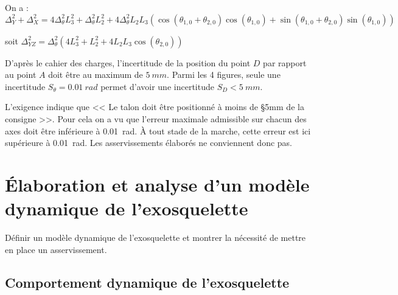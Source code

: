 \ifprof\begin{corrige}
 On a : 
$\Delta_{Y}^2 + \Delta_{X}^2 = 4\Delta_{\theta}^2L_3^2 + \Delta_{\theta}^2L_2^2 
+ 4\Delta_{\theta}^2 L_2 L_3 \left( \cos \left(\theta_{1,0}+ \theta_{2,0}\right)  \cos \left(\theta_{1,0}\right)
+  \sin \left(\theta_{1,0}+ \theta_{2,0}\right)  \sin \left(\theta_{1,0}\right) \right)$

soit 
$\Delta_{YZ}^2 = \Delta_{\theta}^2 \left(4L_3^2 + L_2^2 
+ 4 L_2 L_3 \cos \left(\theta_{2,0} \right)\right)$
\end{corrige}\else\fi


\ifprof\begin{corrige}
D'après le cahier des charges, l'incertitude de la position du point
$D$ par rapport au point  $A$  doit être au maximum de $\SI{5}{mm}$. Parmi les 4 figures, seule une incertitude $S_{\theta}=\SI{0,01}{rad}$ permet d'avoir une incertitude $S_D < \SI{5}{mm}$.

\end{corrige}\else\fi


\ifprof\begin{corrige}
L'exigence indique que << Le talon doit être positionné à moins de
\S{5}{mm} de la consigne >>. Pour cela on a vu que l'erreur maximale admissible sur chacun des axes doit être inférieure à \SI{0,01}{rad}. À tout stade de la marche, cette erreur est ici supérieure à \SI{0,01}{rad}. Les asservissements élaborés ne conviennent donc pas.
\end{corrige}\else\fi


\section{Élaboration et analyse d'un modèle dynamique de l'exosquelette}
\ifprof
\else
\begin{obj}
{Définir un modèle dynamique de l’exosquelette et montrer la nécessité de mettre en place un asservissement.}
\end{obj}
\fi
\subsection{Comportement dynamique de l'exosquelette}

